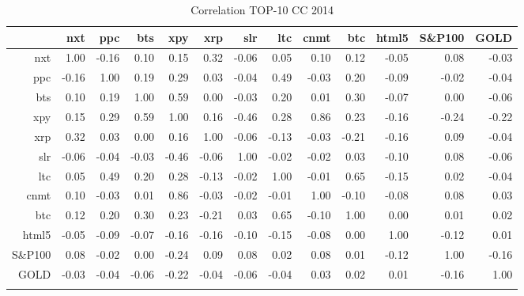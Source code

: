 
\begin{table}[ht]
\centering
\begin{tabular}{rrrrrrrrrrrrr}
  \hline
 & nxt & ppc & bts & xpy & xrp & slr & ltc & cnmt & btc & html5 & S\&P100 & GOLD \\ 
  \hline
nxt & 1.00 & -0.16 & 0.10 & 0.15 & 0.32 & -0.06 & 0.05 & 0.10 & 0.12 & -0.05 & 0.08 & -0.03 \\ 
  ppc & -0.16 & 1.00 & 0.19 & 0.29 & 0.03 & -0.04 & 0.49 & -0.03 & 0.20 & -0.09 & -0.02 & -0.04 \\ 
  bts & 0.10 & 0.19 & 1.00 & 0.59 & 0.00 & -0.03 & 0.20 & 0.01 & 0.30 & -0.07 & 0.00 & -0.06 \\ 
  xpy & 0.15 & 0.29 & 0.59 & 1.00 & 0.16 & -0.46 & 0.28 & 0.86 & 0.23 & -0.16 & -0.24 & -0.22 \\ 
  xrp & 0.32 & 0.03 & 0.00 & 0.16 & 1.00 & -0.06 & -0.13 & -0.03 & -0.21 & -0.16 & 0.09 & -0.04 \\ 
  slr & -0.06 & -0.04 & -0.03 & -0.46 & -0.06 & 1.00 & -0.02 & -0.02 & 0.03 & -0.10 & 0.08 & -0.06 \\ 
  ltc & 0.05 & 0.49 & 0.20 & 0.28 & -0.13 & -0.02 & 1.00 & -0.01 & 0.65 & -0.15 & 0.02 & -0.04 \\ 
  cnmt & 0.10 & -0.03 & 0.01 & 0.86 & -0.03 & -0.02 & -0.01 & 1.00 & -0.10 & -0.08 & 0.08 & 0.03 \\ 
  btc & 0.12 & 0.20 & 0.30 & 0.23 & -0.21 & 0.03 & 0.65 & -0.10 & 1.00 & 0.00 & 0.01 & 0.02 \\ 
  html5 & -0.05 & -0.09 & -0.07 & -0.16 & -0.16 & -0.10 & -0.15 & -0.08 & 0.00 & 1.00 & -0.12 & 0.01 \\ 
  S\&P100 & 0.08 & -0.02 & 0.00 & -0.24 & 0.09 & 0.08 & 0.02 & 0.08 & 0.01 & -0.12 & 1.00 & -0.16 \\ 
  GOLD & -0.03 & -0.04 & -0.06 & -0.22 & -0.04 & -0.06 & -0.04 & 0.03 & 0.02 & 0.01 & -0.16 & 1.00 \\ 
   \hline
   \caption{Correlation TOP-10 CC 2014}
\end{tabular}
\end{table}

